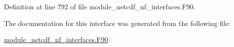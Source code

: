 Definition at line 792 of file module\+\_\+netcdf\+\_\+nf\+\_\+interfaces.\+F90.



The documentation for this interface was generated from the following file\+:\begin{DoxyCompactItemize}
\item 
\hyperlink{module__netcdf__nf__interfaces_8F90}{module\+\_\+netcdf\+\_\+nf\+\_\+interfaces.\+F90}\end{DoxyCompactItemize}
